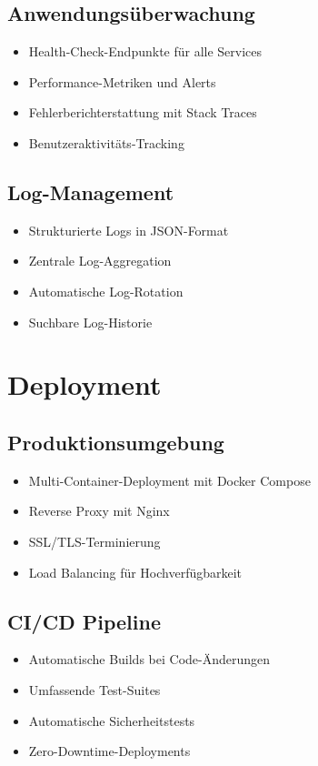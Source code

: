 \documentclass[a4paper,12pt]{article}
\begin{document}
\subsection{Anwendungsüberwachung}
\begin{itemize}
    \item Health-Check-Endpunkte für alle Services
    \item Performance-Metriken und Alerts
    \item Fehlerberichterstattung mit Stack Traces
    \item Benutzeraktivitäts-Tracking
\end{itemize}

\subsection{Log-Management}
\begin{itemize}
    \item Strukturierte Logs in JSON-Format
    \item Zentrale Log-Aggregation
    \item Automatische Log-Rotation
    \item Suchbare Log-Historie
\end{itemize}

\section{Deployment}

\subsection{Produktionsumgebung}
\begin{itemize}
    \item Multi-Container-Deployment mit Docker Compose
    \item Reverse Proxy mit Nginx
    \item SSL/TLS-Terminierung
    \item Load Balancing für Hochverfügbarkeit
\end{itemize}

\subsection{CI/CD Pipeline}
\begin{itemize}
    \item Automatische Builds bei Code-Änderungen
    \item Umfassende Test-Suites
    \item Automatische Sicherheitstests
    \item Zero-Downtime-Deployments
\end{itemize}
\end{document}
